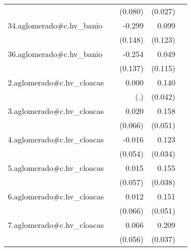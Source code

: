 {\begin{longtable}{l*{4}{D{.}{.}{-1}}}
            &                     &     (0.080)         &     (0.027)         &                     \\
\addlinespace
34.aglomerado#c.hv\_banio&                     &      -0.299\sym{*}  &       0.099         &                     \\
            &                     &     (0.148)         &     (0.123)         &                     \\
\addlinespace
36.aglomerado#c.hv\_banio&                     &      -0.254         &       0.049         &                     \\
            &                     &     (0.137)         &     (0.115)         &                     \\
\addlinespace
2.aglomerado#c.hv\_cloacas&                     &       0.000         &       0.140\sym{***}&                     \\
            &                     &         (.)         &     (0.042)         &                     \\
\addlinespace
3.aglomerado#c.hv\_cloacas&                     &       0.020         &       0.158\sym{**} &                     \\
            &                     &     (0.066)         &     (0.051)         &                     \\
\addlinespace
4.aglomerado#c.hv\_cloacas&                     &      -0.016         &       0.123\sym{***}&                     \\
            &                     &     (0.054)         &     (0.034)         &                     \\
\addlinespace
5.aglomerado#c.hv\_cloacas&                     &       0.015         &       0.155\sym{***}&                     \\
            &                     &     (0.057)         &     (0.038)         &                     \\
\addlinespace
6.aglomerado#c.hv\_cloacas&                     &       0.012         &       0.151\sym{**} &                     \\
            &                     &     (0.066)         &     (0.051)         &                     \\
\addlinespace
7.aglomerado#c.hv\_cloacas&                     &       0.066         &       0.209\sym{***}&                     \\
            &                     &     (0.056)         &     (0.037)         &                     \\

\end{longtable}}
